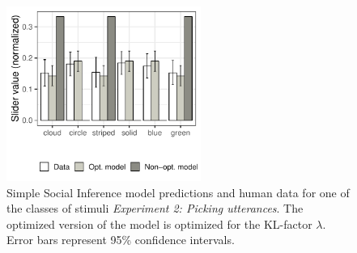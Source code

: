 \documentclass[11pt,a4paper]{article}
\newcommand{\gcs}[1]{\textcolor{blue}{[gcs: #1]}}
\begin{document}
\begin{figure}[ht!]
	\centering
	\includegraphics[width=2.5in]{images/december_barplot_x3.pdf}
	\caption{Simple Social Inference model predictions and human data for one of the classes of stimuli \emph{Experiment 2: Picking utterances}. The optimized version of the model is optimized for the KL-factor $\lambda$. Error bars represent 95\% confidence intervals.}\label{barplot_x3}
\end{figure}


\end{document}
